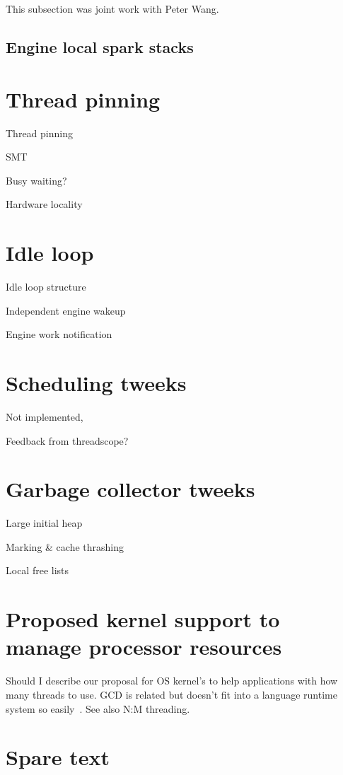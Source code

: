 This subsection was joint work with Peter Wang.

\subsection{Engine local spark stacks}

\section{Thread pinning}

Thread pinning

SMT

Busy waiting?

Hardware locality

\section{Idle loop}

Idle loop structure

Independent engine wakeup

Engine work notification

\section{Scheduling tweeks}

Not implemented,

Feedback from threadscope?

\section{Garbage collector tweeks}

Large initial heap

Marking \& cache thrashing

Local free lists

\section{Proposed kernel support to manage processor resources}

    
Should I describe our proposal for OS kernel's to help
applications with how many threads to use.
GCD is related but doesn't fit into a language runtime system so
easily~\cite{apple_gcd}.
See also N:M threading.

\section{Spare text}

